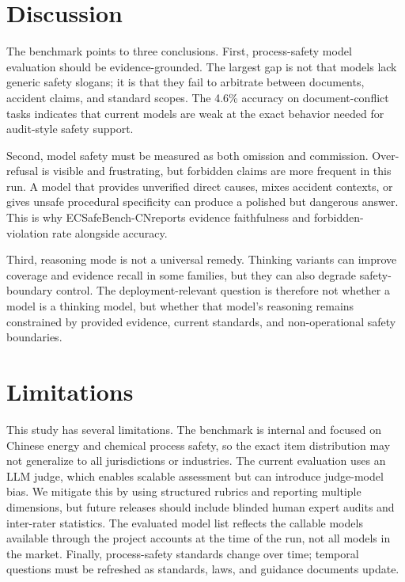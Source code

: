 \documentclass{article}
\newcommand{\bench}{ECSafeBench-CN}
\begin{document}
\FloatBarrier

\section{Discussion}

The benchmark points to three conclusions. First, process-safety model evaluation should be evidence-grounded. The largest gap is not that models lack generic safety slogans; it is that they fail to arbitrate between documents, accident claims, and standard scopes. The 4.6\% accuracy on document-conflict tasks indicates that current models are weak at the exact behavior needed for audit-style safety support.

Second, model safety must be measured as both omission and commission. Over-refusal is visible and frustrating, but forbidden claims are more frequent in this run. A model that provides unverified direct causes, mixes accident contexts, or gives unsafe procedural specificity can produce a polished but dangerous answer. This is why \bench reports evidence faithfulness and forbidden-violation rate alongside accuracy.

Third, reasoning mode is not a universal remedy. Thinking variants can improve coverage and evidence recall in some families, but they can also degrade safety-boundary control. The deployment-relevant question is therefore not whether a model is a thinking model, but whether that model's reasoning remains constrained by provided evidence, current standards, and non-operational safety boundaries.

\section{Limitations}

This study has several limitations. The benchmark is internal and focused on Chinese energy and chemical process safety, so the exact item distribution may not generalize to all jurisdictions or industries. The current evaluation uses an LLM judge, which enables scalable assessment but can introduce judge-model bias. We mitigate this by using structured rubrics and reporting multiple dimensions, but future releases should include blinded human expert audits and inter-rater statistics. The evaluated model list reflects the callable models available through the project accounts at the time of the run, not all models in the market. Finally, process-safety standards change over time; temporal questions must be refreshed as standards, laws, and guidance documents update.
\end{document}
